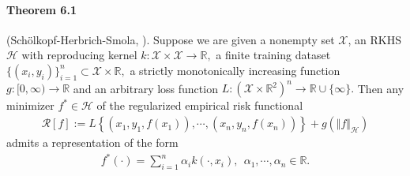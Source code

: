 \documentclass{article}
\begin{document}
\paragraph{Theorem 6.1} (Schölkopf-Herbrich-Smola, \cite{SHS}). Suppose we are given a nonempty set $\mathcal{X}$, an RKHS $\mathcal{H}$ with reproducing kernel $k:\mathcal{X}\times\mathcal{X}\to\mathbb{R},$ a
finite training dataset $\lbrace(x_i, y_i)\rbrace_{i=1}^n\subset\mathcal{X}\times\mathbb{R},$ a strictly monotonically increasing function  $g:[0,\infty)\to\mathbb{R}$ and an arbitrary loss function $L:(\mathcal{X}\times\mathbb{R}^2)^n \to \mathbb{R}\cup\lbrace\infty\rbrace.$ Then any minimizer $f^*\in\mathcal{H}$ of the regularized empirical risk functional
\begin{align*}
	\mathcal{R}[f] := L\left\lbrace\left(x_1,y_1,f(x_1)\right),\cdots,\left(x_n,y_n,f(x_n)\right)\right\rbrace + g(\Vert f\Vert_\mathcal{H})\tag{6.8}
\end{align*}
admits a representation of the form
\begin{align*}
	f^*(\cdot) = \sum_{i=1}^n\alpha_i k(\cdot, x_i),\ \ \alpha_1,\cdots,\alpha_n\in\mathbb{R}.\tag{6.9}
\end{align*}
\end{document}
